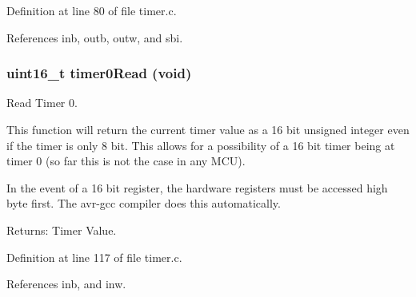 Definition at line 80 of file timer.c.

References inb, outb, outw, and sbi.
\subsubsection{\setlength{\rightskip}{0pt plus 5cm}uint16\_\-t timer0Read (void)}\label{timer_8c_2adf0209d1f6848fafd9ec30e2e21676}


Read Timer 0. 

This function will return the current timer value as a 16 bit unsigned integer even if the timer is only 8 bit. This allows for a possibility of a 16 bit timer being at timer 0 (so far this is not the case in any MCU).

In the event of a 16 bit register, the hardware registers must be accessed high byte first. The avr-gcc compiler does this automatically.

\begin{Desc}
\item[Returns:]Timer Value. \end{Desc}


Definition at line 117 of file timer.c.

References inb, and inw.